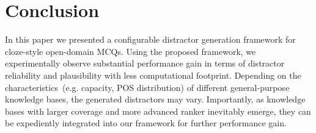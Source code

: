 \section{Conclusion}
\label{sec:conclusion}
In this paper we presented a configurable distractor generation framework for cloze-style open-domain MCQs. 
Using the proposed framework, we experimentally observe substantial performance gain in terms of distractor reliability and plausibility with less computational footprint. Depending on the characteristics~(e.g. capacity, POS distribution) of different general-purpose knowledge bases, the generated distractors may vary. Importantly, as knowledge bases with larger coverage and more advanced ranker inevitably emerge, they can be expediently integrated into our framework for further performance gain.

